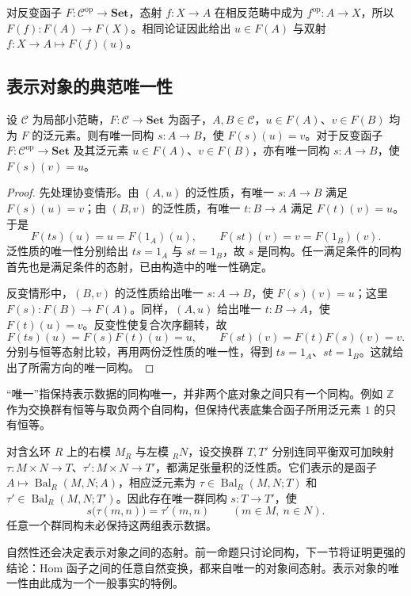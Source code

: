 对反变函子 \(F:\mathcal C^{\mathrm{op}}\rightarrow\mathbf{Set}\)，态射 \(f:X\rightarrow A\) 在相反范畴中成为 \(f^{\mathrm{op}}:A\rightarrow X\)，所以 \(F(f):F(A)\rightarrow F(X)\)。相同论证因此给出 \(u\in F(A)\) 与双射 \(f:X\rightarrow A\mapsto F(f)(u)\)。

\subsection{表示对象的典范唯一性}
\label{b4:subsec:0301:03}

\begin{proposition}\label{b4:prop:representing-unique}
	设 \(\mathcal C\) 为局部小范畴，\(F:\mathcal C\rightarrow\mathbf{Set}\) 为函子，\(A,B\in\mathcal C\)，\(u\in F(A)\)、\(v\in F(B)\) 均为 \(F\) 的泛元素。则有唯一同构 \(s:A\rightarrow B\)，使 \(F(s)(u)=v\)。对于反变函子 \(F:\mathcal C^{\mathrm{op}}\rightarrow\mathbf{Set}\) 及其泛元素 \(u\in F(A)\)、\(v\in F(B)\)，亦有唯一同构 \(s:A\rightarrow B\)，使 \(F(s)(v)=u\)。
\end{proposition}
\begin{proof}
	先处理协变情形。由 \((A,u)\) 的泛性质，有唯一 \(s:A\rightarrow B\) 满足 \(F(s)(u)=v\)；由 \((B,v)\) 的泛性质，有唯一 \(t:B\rightarrow A\) 满足 \(F(t)(v)=u\)。于是
	\[
		F(ts)(u)=u=F(1_A)(u),\qquad F(st)(v)=v=F(1_B)(v).
	\]
	泛性质的唯一性分别给出 \(ts=1_A\) 与 \(st=1_B\)，故 \(s\) 是同构。任一满足条件的同构首先也是满足条件的态射，已由构造中的唯一性确定。

	反变情形中，\((B,v)\) 的泛性质给出唯一 \(s:A\rightarrow B\)，使 \(F(s)(v)=u\)；这里 \(F(s):F(B)\rightarrow F(A)\)。同样，\((A,u)\) 给出唯一 \(t:B\rightarrow A\)，使 \(F(t)(u)=v\)。反变性使复合次序翻转，故
	\[
		F(ts)(u)=F(s)F(t)(u)=u,\qquad F(st)(v)=F(t)F(s)(v)=v.
	\]
	分别与恒等态射比较，再用两份泛性质的唯一性，得到 \(ts=1_A\)、\(st=1_B\)。这就给出了所需方向的唯一同构。
\end{proof}

“唯一”指保持表示数据的同构唯一，并非两个底对象之间只有一个同构。例如 \(\mathbb Z\) 作为交换群有恒等与取负两个自同构，但保持代表底集合函子所用泛元素 \(1\) 的只有恒等。

\ProseParagraphBreak
对含幺环 \(R\) 上的右模 \(M_R\) 与左模 \({}_RN\)，设交换群 \(T,T'\) 分别连同平衡双可加映射 \(\tau:M\times N\rightarrow T\)、\(\tau':M\times N\rightarrow T'\)，都满足张量积的泛性质。它们表示的是函子 \(A\mapsto\operatorname{Bal}_R(M,N;A)\)，相应泛元素为 \(\tau\in\operatorname{Bal}_R(M,N;T)\) 和 \(\tau'\in\operatorname{Bal}_R(M,N;T')\)。因此存在唯一群同构 \(s:T\rightarrow T'\)，使
\[
	s\bigl(\tau(m,n)\bigr)=\tau'(m,n) \qquad(m\in M,\ n\in N).
\]
任意一个群同构未必保持这两组表示数据。

\ProseParagraphBreak
自然性还会决定表示对象之间的态射。前一命题只讨论同构，下一节将证明更强的结论：Hom 函子之间的任意自然变换，都来自唯一的对象间态射。表示对象的唯一性由此成为一个一般事实的特例。
